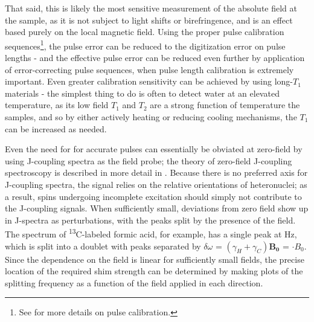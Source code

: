\documentclass[PaulGanssle-Thesis.tex]{subfiles}
\begin{document}
That said, this is likely the most sensitive measurement of the absolute field at the sample, as it is not subject to light shifts or birefringence, and is an effect based purely on the local magnetic field. Using the proper pulse calibration sequences\footnote{See  for more details on pulse calibration.}, the pulse error can be reduced to the digitization error on pulse lengths - and the effective pulse error can be reduced even further by application of error-correcting pulse sequences, when pulse length calibration is extremely important. Even greater calibration sensitivity can be achieved by using long-$T_1$ materials - the simplest thing to do is often to detect water at an elevated temperature, as its low field $T_{1}$ and $T_{2}$ are a strong function of temperature the samples, and so by either actively heating or reducing cooling mechanisms, the $T_1$ can be increased as needed.

Even the need for for accurate pulses can essentially be obviated at zero-field by using J-coupling spectra as the field probe; the theory of zero-field J-coupling spectroscopy is described in more detail in . Because there is no preferred axis for J-coupling spectra, the signal relies on the relative orientations of heteronuclei; as a result, spins undergoing incomplete excitation should simply not contribute to the J-coupling signals. When sufficiently small, deviations from zero field show up in J-spectra as perturbations, with the peaks split by the presence of the field.\cite{Ledbetter2011} The spectrum of \textsuperscript{13}C-labeled formic acid, for example, has a single peak at \unit[222]{Hz}, which is split into a doublet with peaks separated by $\delta\omega$ = $(\gamma_{H} + \gamma_{C})\mathbf{B_{0}}$ = $\cdot B_{0}$. Since the dependence on the field is linear for sufficiently small fields, the precise location of the required shim strength can be determined by making plots of the splitting frequency as a function of the field applied in each direction.
\end{document}
